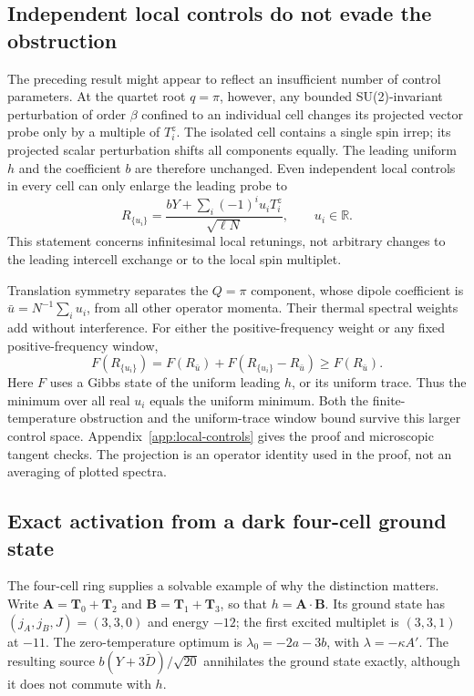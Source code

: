 \subsection{Independent local controls do not evade the obstruction}

The preceding result might appear to reflect an insufficient number of
control parameters. At the quartet root $q=\pi$, however, any bounded
SU(2)-invariant perturbation of order $\beta$ confined to an individual
cell changes its projected vector probe only by a multiple of $T_i^z$.
The isolated cell contains a single spin irrep; its projected scalar
perturbation shifts all components equally. The leading uniform $h$ and
the coefficient $b$ are therefore unchanged. Even independent local
controls in every cell can only enlarge the leading probe to
\begin{equation}
 R_{\{u_i\}}=\frac{bY+\sum_i(-1)^iu_iT_i^z}{\sqrt{\ell N}},
 \qquad u_i\in\mathbb R.
 \label{eq:local-control-probe}
\end{equation}
This statement concerns infinitesimal local retunings, not arbitrary
changes to the leading intercell exchange or to the local spin multiplet.

Translation symmetry separates the $Q=\pi$ component, whose dipole
coefficient is $\bar u=N^{-1}\sum_i u_i$, from all other operator momenta.
Their thermal spectral weights add without interference. For either the
positive-frequency weight or any fixed positive-frequency window,
\begin{equation}
 F(R_{\{u_i\}})=F(R_{\bar u})+
 F(R_{\{u_i\}}-R_{\bar u})\ge F(R_{\bar u}).
 \label{eq:local-control-projection}
\end{equation}
Here $F$ uses a Gibbs state of the uniform leading $h$, or its uniform
trace. Thus the minimum over all real $u_i$ equals the uniform minimum.
Both the finite-temperature obstruction and the uniform-trace window
bound survive this larger control space. Appendix~\ref{app:local-controls}
gives the proof and microscopic tangent checks. The projection is an
operator identity used in the proof, not an averaging of plotted spectra.

\subsection{Exact activation from a dark four-cell ground state}

The four-cell ring supplies a solvable example of why the distinction
matters. Write $\bm A=\bm T_0+\bm T_2$ and
$\bm B=\bm T_1+\bm T_3$, so that $h=\bm A\cdot\bm B$.
Its ground state has $(j_A,j_B,J)=(3,3,0)$ and energy $-12$;
the first excited multiplet is $(3,3,1)$ at $-11$.
The zero-temperature optimum is $\lambda_0=-2a-3b$, with
$\lambda=-\kappa A'$. The resulting source
$b(Y+3\widetilde D)/\sqrt{20}$ annihilates the ground state exactly,
although it does not commute with $h$.

